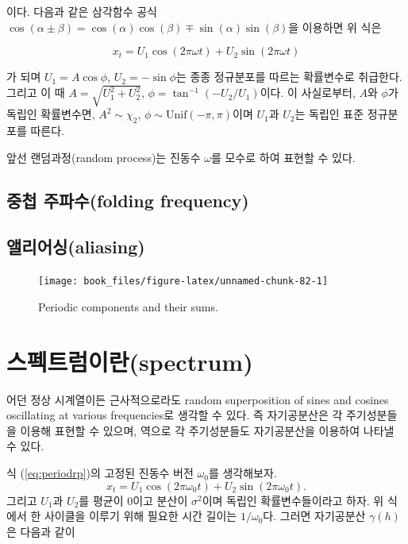 \documentclass[b5paper,]{scrbook}
\theoremstyle{plain}
\theoremstyle{definition}
\numberwithin{equation}{section}
\let\BeginKnitrBlock\begin \let\EndKnitrBlock\end
\begin{document}
이다. 다음과 같은 삼각함수 공식
\(\cos (\alpha \pm \beta)= \cos (\alpha) \cos (\beta) \mp \sin(\alpha)\sin(\beta)\)을
이용하면 위 식은

\begin{equation}\label{eq:periodrp}
x_{t}=U_{1}\cos(2\pi\omega t) + U_{2}\sin(2\pi\omega t)
\end{equation}

가 되며 \(U_{1}=A\cos \phi\), \(U_{2}=-\sin\phi\)는 종종 정규분포를
따르는 확률변수로 취급한다. 그리고 이 때
\(A=\sqrt{U_{1}^{2}+U_{2}^{2}}\), \(\phi=\tan^{-1}(-U_{2}/U_{1})\)이다.
이 사실로부터, \(A\)와 \(\phi\)가 독립인 확률변수면,
\(A^{2}\sim \chi_{2}\), \(\phi \sim \text{Unif}(-\pi, \pi)\)이며
\(U_{1}\)과 \(U_{2}\)는 독립인 표준 정규분포를 따른다.

앞선 랜덤과정(random process)는 진동수 \(\omega\)를 모수로 하여 표현할
수 있다.

\subsection{중첩 주파수(folding frequency)}\label{-folding-frequency}

\subsection{앨리어싱(aliasing)}\label{aliasing}

\begin{figure}

{\centering \texttt{[image: book\_files/figure-latex/unnamed-chunk-82-1]} 

}

\caption{Periodic components and their sums.}\label{fig:unnamed-chunk-82}
\end{figure}

\section{스펙트럼이란(spectrum)}\label{spectrum}

\BeginKnitrBlock{theorem}[정상과정의 스펙트럼 표현]
\protect\hypertarget{thm:unnamed-chunk-83}{}{\label{thm:unnamed-chunk-83}
{} } 어던 정상 시계열이든
근사적으로라도 random superposition of sines and cosines oscillating at
various frequencies로 생각할 수 있다. 즉 자기공분산은 각 주기성분들을
이용해 표현할 수 있으며, 역으로 각 주기성분들도 자기공분산을 이용하여
나타낼 수 있다.
\EndKnitrBlock{theorem}

식 (\eqref{eq:periodrp})의 고정된 진동수 버전 \(\omega_{0}\)를 생각해보자.
\[x_{t}=U_{1}\cos (2\pi\omega_{0}t) + U_{2}\sin(2\pi\omega_{0}t).\]
그리고 \(U_{1}\)과 \(U_{2}\)를 평균이 0이고 분산이 \(\sigma^{2}\)이며
독립인 확률변수들이라고 하자. 위 식에서 한 사이클을 이루기 위해 필요한
시간 길이는 \(1/\omega_{0}\)다. 그러면 자기공분산 \(\gamma(h)\)은 다음과
같이
\end{document}
